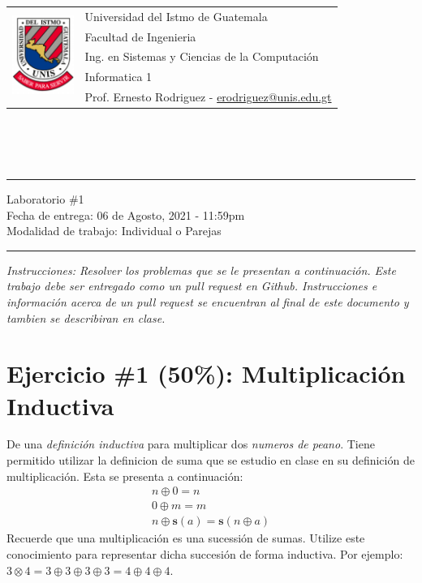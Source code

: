 \documentclass{article}
\newcommand{\horrule}[1]{\rule{\linewidth}{#1}}
\newcommand{\perlscript}[2]{
\begin{itemize}
\item[]
\end{itemize}
}
\begin{document}
\begin{tabular}{l l}
\multirow{5}{*}{\includegraphics[width=2cm]{../../recursos/logo.png}} & Universidad del Istmo de Guatemala \\
 & Facultad de Ingenieria \\
 & Ing. en Sistemas y Ciencias de la Computaci\'on \\
 & Informatica 1 \\
 & Prof. Ernesto Rodriguez - \href{mailto:erodriguez@unis.edu.gt}{erodriguez@unis.edu.gt} \\
\end{tabular}
\\\\\\

\begin{center}
        \horrule{0.5pt}
        \huge{Laboratorio \#1} \\
        \large{Fecha de entrega: 06 de Agosto, 2021 - 11:59pm} \\
        \large{Modalidad de trabajo: Individual o Parejas}
        \horrule{1pt}
\end{center}

\emph{Instrucciones: Resolver los problemas que se le presentan a
continuaci\'on. Este trabajo debe ser entregado como un pull request
en Github. Instrucciones e informaci\'on acerca de un pull request
se encuentran al final de este documento y tambien se describiran
en clase.}


\section*{Ejercicio \#1 (50\%): Multiplicaci\'on Inductiva}
De una \emph{definici\'on inductiva} para multiplicar dos \emph{numeros de peano}.
Tiene permitido utilizar la definicion de suma que se estudio en clase en
su definici\'on de multiplicaci\'on. Esta se presenta a continuaci\'on:
\[
    \begin{array}{l}
        n \oplus 0 = n \\
        0 \oplus m = m \\
        n \oplus \mathbf{s}(a) = \mathbf{s}(n \oplus a)
    \end{array}
\]
Recuerde que una multiplicaci\'on es una sucessi\'on de sumas. Utilize
este conocimiento para representar dicha succesi\'on de forma inductiva.
Por ejemplo: $3 \otimes 4 = 3 \oplus 3 \oplus 3 \oplus 3 = 4 \oplus 4 \oplus 4$.
\end{document}
